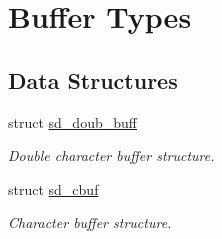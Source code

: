 \hypertarget{group___s_d___buffer___types}{}\section{Buffer Types}
\label{group___s_d___buffer___types}
\subsection*{Data Structures}
\begin{DoxyCompactItemize}
\item 
struct \mbox{\hyperlink{structsd__doub__buff}{sd\+\_\+doub\+\_\+buff}}
\begin{DoxyCompactList}\small\item\em Double character buffer structure. \end{DoxyCompactList}\item 
struct \mbox{\hyperlink{structsd__cbuf}{sd\+\_\+cbuf}}
\begin{DoxyCompactList}\small\item\em Character buffer structure. \end{DoxyCompactList}\end{DoxyCompactItemize}
